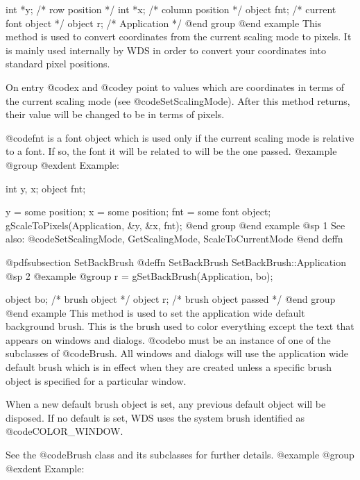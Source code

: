 int     *y;     /*  row position         */
int     *x;     /*  column position      */
object  fnt;    /*  current font object  */
object  r;      /*  Application          */
@end group
@end example
This method is used to convert coordinates from the current scaling mode
to pixels.  It is mainly used internally by WDS in order to convert
your coordinates into standard pixel positions.

On entry @code{x} and @code{y} point to values which are coordinates
in terms of the current scaling mode (see @code{SetScalingMode}).
After this method returns, their value will be changed to be in terms
of pixels.

@code{fnt} is a font object which is used only if the current scaling
mode is relative to a font.  If so, the font it will be related to
will be the one passed.
@example
@group
@exdent Example:

int     y, x;
object  fnt;

y = some position;
x = some position;
fnt = some font object;
gScaleToPixels(Application, &y, &x, fnt);
@end group
@end example
@sp 1
See also:  @code{SetScalingMode, GetScalingMode, ScaleToCurrentMode}
@end deffn
















@pdfsubsection {SetBackBrush}
@deffn {SetBackBrush} SetBackBrush::Application
@sp 2
@example
@group
r = gSetBackBrush(Application, bo);

object  bo;     /*  brush object         */
object  r;      /*  brush object passed  */
@end group
@end example
This method is used to set the application wide default background
brush.  This is the brush used to color everything except the text that
appears on windows and dialogs.  @code{bo} must be an instance of one of
the subclasses of @code{Brush}.  All windows and dialogs will use the
application wide default brush which is in effect when they are created
unless a specific brush object is specified for a particular window.

When a new default brush object is set, any previous default object
will be disposed.  If no default is set, WDS uses the system brush
identified as @code{COLOR_WINDOW}.

See the @code{Brush} class and its subclasses for further details.
@example
@group
@exdent Example:


